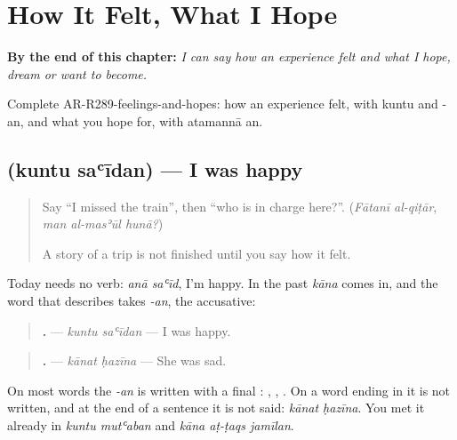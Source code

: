 
\chapter{How It Felt, What I Hope}
\label{ch:ar-how-it-felt-what-i-hope}

\begin{chapteropening}
\textbf{By the end of this chapter:} \emph{I can say how an experience felt and what I hope, dream or want to become.}

Complete AR-R289-feelings-and-hopes: how an experience felt, with kuntu and -an, and what you hope for, with atamannā an.
\end{chapteropening}

\section[\texorpdfstring{\ar{كنت} \ar{سعيدا} (kuntu saʿīdan)}{كنت سعيدا (kuntu saʿīdan)}]{  (kuntu saʿīdan) — I was happy}

\label{lesson:AR-C289-kuntu-saidan}



\begin{quote}
Say \textquotedblleft{}I missed the train\textquotedblright{}, then \textquotedblleft{}who is in charge here?\textquotedblright{}. (\emph{Fātanī al-qiṭār}, \emph{man al-masʾūl hunā?})

A story of a trip is not finished until you say how it felt.
\end{quote}

\begin{grammarlens}[title={Grammar Lens: kāna and the -an}]
Today needs no verb: \emph{anā saʿīd}, I'm happy. In the past \emph{kāna} comes in, and the word that describes takes \emph{-an}, the accusative:

\begin{quote}
\textbf{ .} — \emph{kuntu saʿīdan} — I was happy.
\end{quote}

\begin{quote}
\textbf{ .} — \emph{kānat ḥazīna} — She was sad.
\end{quote}

On most words the \emph{-an} is written with a final \textbf{}: \textbf{}, \textbf{}, \textbf{}. On a word ending in \textbf{} it is not written, and at the end of a sentence it is not said: \emph{kānat ḥazīna}. You met it already in \emph{kuntu mutʿaban} and \emph{kāna aṭ-ṭaqs jamīlan}.
\end{grammarlens}

